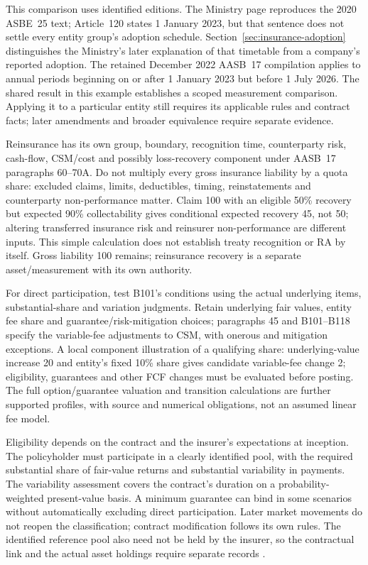 This comparison uses identified editions. The Ministry page reproduces the
2020 ASBE~25 text; Article~120 states 1 January 2023, but that sentence does
not settle every entity group's adoption schedule.
Section~\ref{sec:insurance-adoption} distinguishes the Ministry's later
explanation of that timetable from a company's reported adoption. The retained
December 2022 AASB~17 compilation applies to annual periods beginning on or
after 1 January 2023 but before 1 July 2026. The shared result in this example
establishes a scoped measurement comparison. Applying it to a particular entity
still requires its applicable rules and contract facts; later amendments and
broader equivalence require separate evidence.

Reinsurance has its own group, boundary, recognition time, counterparty risk, cash-flow, CSM/cost and possibly loss-recovery component under AASB~17 paragraphs 60--70A. Do not multiply every gross insurance liability by a quota share: excluded claims, limits, deductibles, timing, reinstatements and counterparty non-performance matter. Claim 100 with an eligible 50\% recovery but expected 90\% collectability gives conditional expected recovery 45, not 50; altering transferred insurance risk and reinsurer non-performance are different inputs. This simple calculation does not establish treaty recognition or RA by itself. Gross liability 100 remains; reinsurance recovery is a separate asset/measurement with its own authority.

For direct participation, test B101's conditions using the actual underlying items, substantial-share and variation judgments. Retain underlying fair values, entity fee share and guarantee/risk-mitigation choices; paragraphs 45 and B101--B118 specify the variable-fee adjustments to CSM, with onerous and mitigation exceptions. A local component illustration of a qualifying share: underlying-value increase 20 and entity's fixed 10\% share gives candidate variable-fee change 2; eligibility, guarantees and other FCF changes must be evaluated before posting. The full option/guarantee valuation and transition calculations are further supported profiles, with source and numerical obligations, not an assumed linear fee model.

Eligibility depends on the contract and the insurer's expectations at inception.
The policyholder must participate in a clearly identified pool, with the
required substantial share of fair-value returns and substantial variability
in payments. The variability assessment covers the contract's duration on a
probability-weighted present-value basis. A minimum guarantee can bind in some
scenarios without automatically excluding direct participation. Later market
movements do not reopen the classification; contract modification follows its
own rules. The identified reference pool also need not be held by the insurer,
so the contractual link and the actual asset holdings require separate records
\citep[paragraphs B101--B108 and 72]{aasb17}.

